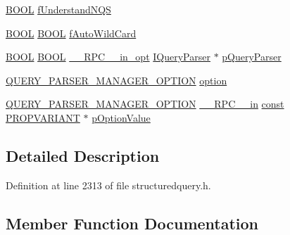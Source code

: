 \begin{DoxyCompactItemize}
\item 
\hyperlink{nfilterkit_8h_a3be13892ae7076009afcf121347dd319}{B\+O\+OL} \hyperlink{struct_i_query_parser_manager_vtbl_aec68576d16c3ea429d92c5c8f7fdde9c}{f\+Understand\+N\+QS}
\item 
\hyperlink{nfilterkit_8h_a3be13892ae7076009afcf121347dd319}{B\+O\+OL} \hyperlink{nfilterkit_8h_a3be13892ae7076009afcf121347dd319}{B\+O\+OL} \hyperlink{struct_i_query_parser_manager_vtbl_aeab8eb0ab7da200f375cef534b9ef3c0}{f\+Auto\+Wild\+Card}
\item 
\hyperlink{nfilterkit_8h_a3be13892ae7076009afcf121347dd319}{B\+O\+OL} \hyperlink{nfilterkit_8h_a3be13892ae7076009afcf121347dd319}{B\+O\+OL} \hyperlink{rpcsal_8h_a6e152ac84637d70f0453366759b3b9fb}{\+\_\+\+\_\+\+R\+P\+C\+\_\+\+\_\+in\+\_\+opt} \hyperlink{structuredquery_8h_ac6bf6a3bb0538d5785821c0c7e2081e5}{I\+Query\+Parser} $\ast$ \hyperlink{struct_i_query_parser_manager_vtbl_a0114f3abfec80ef1bf6909c5accc90f2}{p\+Query\+Parser}
\item 
\hyperlink{structuredquery_8h_ac58b182a4b310b849761315298e88d06}{Q\+U\+E\+R\+Y\+\_\+\+P\+A\+R\+S\+E\+R\+\_\+\+M\+A\+N\+A\+G\+E\+R\+\_\+\+O\+P\+T\+I\+ON} \hyperlink{struct_i_query_parser_manager_vtbl_a8e352c2edd5aa5f48f2acc5149aa537a}{option}
\item 
\hyperlink{structuredquery_8h_ac58b182a4b310b849761315298e88d06}{Q\+U\+E\+R\+Y\+\_\+\+P\+A\+R\+S\+E\+R\+\_\+\+M\+A\+N\+A\+G\+E\+R\+\_\+\+O\+P\+T\+I\+ON} \hyperlink{rpcsal_8h_a20b7f6da600a05c8b541659f14f7f0e6}{\+\_\+\+\_\+\+R\+P\+C\+\_\+\+\_\+in} \hyperlink{getopt1_8c_a2c212835823e3c54a8ab6d95c652660e}{const} \hyperlink{propidl_8h_ae902c1757cd16052896846fa4ebb88d8}{P\+R\+O\+P\+V\+A\+R\+I\+A\+NT} $\ast$ \hyperlink{struct_i_query_parser_manager_vtbl_a70d85e8ea018d49aad51d1ebd77cb8fb}{p\+Option\+Value}
\end{DoxyCompactItemize}


\subsection{Detailed Description}


Definition at line 2313 of file structuredquery.\+h.



\subsection{Member Function Documentation}
